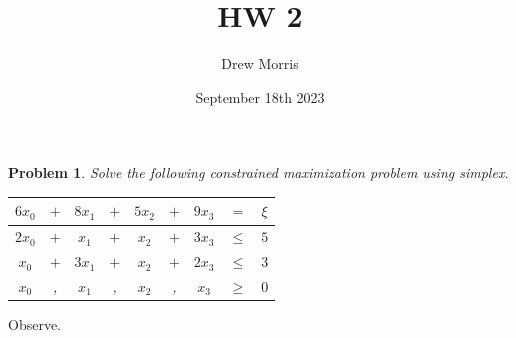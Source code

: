 \documentclass[12pt,oneside]{amsart}
\title{HW 2}
\author{Drew Morris}
\date{September 18th 2023}
\numberwithin{equation}{section}
\numberwithin{figure}{section}
\theoremstyle{plain}
\newtheorem{prob}{Problem}
\theoremstyle{definition}
\begin{document}
\maketitle

\renewcommand{\arraystretch}{1.5}

\begin{prob}
  Solve the following constrained maximization problem using simplex. \\
  \begin{center}\begin{tabular}{|ccccccccc|}
    \hline
    $6x_0$ & $+$ & $8x_1$ & $+$ & $5x_2$ & $+$ & $9x_3$ & $=$ & $\xi$ \\
    \hline
    $2x_0$ & $+$ & $x_1$ & $+$ & $x_2$ & $+$ & $3x_3$ & $\leq$ & $5$ \\
    $x_0$ & $+$ & $3x_1$ & $+$ & $x_2$ & $+$ & $2x_3$ & $\leq$ & $3$ \\
    $x_0$ & , & $x_1$ & , & $x_2$ & , & $x_3$ & $\geq$ & $0$ \\
    \hline
  \end{tabular}\end{center}
\end{prob}
Observe. \\
\end{document}
